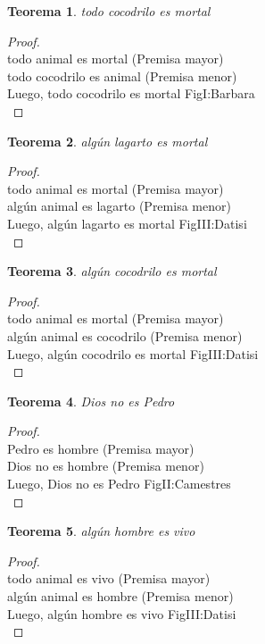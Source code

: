 ﻿\documentclass[12pt]{book}
\newtheorem{theorem}{Teorema}[chapter]
\newtheorem{proof}{Demostración}
\begin{document}
\begin{theorem}
todo cocodrilo es mortal
\label{th: 97}
\end{theorem}\begin{proof}\\todo animal es mortal	 (Premisa mayor) \\todo cocodrilo es animal	 (Premisa menor) \\Luego, todo cocodrilo es mortal	FigI:Barbara \\ \end{proof}
\begin{theorem}
algún lagarto es mortal
\label{th: 98}
\end{theorem}\begin{proof}\\todo animal es mortal	 (Premisa mayor) \\algún animal es lagarto	 (Premisa menor) \\Luego, algún lagarto es mortal	FigIII:Datisi \\ \end{proof}
\begin{theorem}
algún cocodrilo es mortal
\label{th: 99}
\end{theorem}\begin{proof}\\todo animal es mortal	 (Premisa mayor) \\algún animal es cocodrilo	 (Premisa menor) \\Luego, algún cocodrilo es mortal	FigIII:Datisi \\ \end{proof}
\begin{theorem}
Dios no es Pedro
\label{th: 100}
\end{theorem}\begin{proof}\\Pedro es hombre	 (Premisa mayor) \\Dios no es hombre	 (Premisa menor) \\Luego, Dios no es Pedro	FigII:Camestres \\ \end{proof}
\begin{theorem}
algún hombre es vivo
\label{th: 101}
\end{theorem}\begin{proof}\\todo animal es vivo	 (Premisa mayor) \\algún animal es hombre	 (Premisa menor) \\Luego, algún hombre es vivo	FigIII:Datisi \\ \end{proof}
\end{document}
